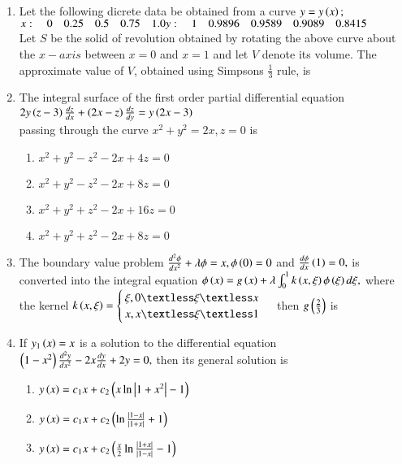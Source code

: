 \documentclass[journal]{IEEEtran}
\begin{document}
\begin{enumerate}
    \item Let the following dicrete data be obtained from a curve $y=y\left(x\right);$\\
    $x: \quad 0 \quad 0.25  \quad 0.5  \quad  0.75  \quad 1.0\\
    y: \quad 1 \quad 0.9896 \quad 0.9589\quad 0.9089 \quad 0.8415$\\
    Let $S$ be the solid of revolution obtained by rotating the above curve about the $x-axis$ between $x=0$ and $x=1$ and let $V$ denote its volume. The approximate value of $V$, obtained using Simpsons $\frac{1}{3}$ rule, is\\
    \item The integral surface of the first order partial differential equation\\
    $2y\left(z-3\right)\frac{dz}{dx}+\left(2x-z\right)\frac{dz}{dy}=y\left(2x-3\right)$\\
    passing through the curve $x^2+y^2=2x,z=0$ is
    \begin{enumerate}
        \item $x^2+y^2-z^2-2x+4z=0$
        \item $x^2+y^2-z^2-2x+8z=0$
        \item $x^2+y^2+z^2-2x+16z=0$
        \item $x^2+y^2+z^2-2x+8z=0$\\
    \end{enumerate}
    \item The boundary value problem $\frac{d^2\phi}{dx^2}+\lambda\phi=x, \phi\left(0\right)=0$ and $\frac{d\phi}{dx}\left(1\right)=0,$ is converted into the integral equation $\phi\left(x\right)=g\left(x\right)+\lambda\int_{0}^{1}k\left(x,\xi\right)\phi\left(\xi\right)d\xi,$ where the kernel $k\brak{x,\xi }=\begin{cases}
    \xi,0\textless\xi\textless x\\x,x\textless \xi \textless 1
    \end{cases} $ then $g\left(\frac{2}{3}\right)$ is\\
    \item If $y_1\left(x\right)=x$ is a solution to the differential equation $\left(1-x^2\right)\frac{d^2y}{dx^2}-2x\frac{dy}{dx}+2y=0,$ then its general solution is 
    \begin{enumerate}
        \item $y\left(x\right)=c_1x+c_2\left(x\ln\left\vert1+x^2\right\vert-1\right)$
        \item $y\left(x\right)=c_1x+c_2\left(\ln\frac{\left\vert1-x\right\vert}{\left\vert1+x\right\vert}+1\right)$
        \item $y\left(x\right)=c_1x+c_2\left(\frac{x}{2}\ln\frac{\left\vert1+x\right\vert}{\left\vert1-x\right\vert}-1\right)$

\end{enumerate}
\end{enumerate}
\end{document}
